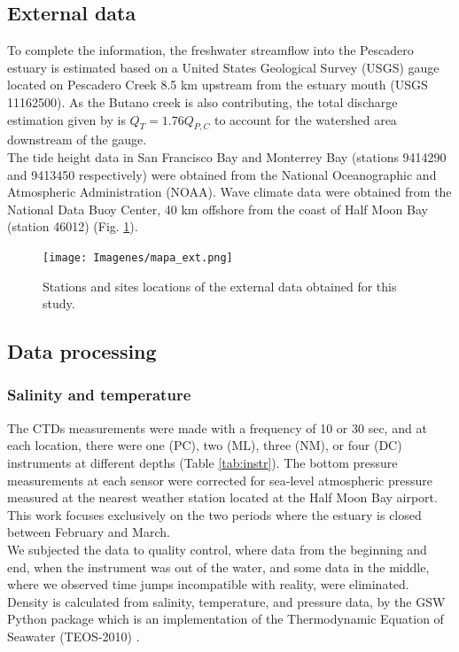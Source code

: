 \documentclass[tesis.tex]{subfiles}
\begin{document}
\subsection{External data}

To complete the information, the freshwater streamflow into the Pescadero estuary is estimated based on a United States Geological Survey (USGS) gauge located on Pescadero Creek 8.5 km upstream from the estuary mouth (USGS 11162500). As the Butano creek is also contributing, the total discharge estimation given by \cite{Williams2014} is $Q_{T} = 1.76 Q_{P,C}$ to account for the watershed area downstream of the gauge.\\

The tide height data in San Francisco Bay and Monterrey Bay (stations 9414290 and 9413450 respectively) were obtained from the National Oceanographic and Atmospheric Administration (NOAA). Wave climate data were obtained from the National Data Buoy Center, 40 km offshore from the coast of Half Moon Bay (station 46012) (Fig. \ref{fig:mapext}). 

\begin{figure}[h!]
    \centering
    \texttt{[image: Imagenes/mapa\_ext.png]}
    \caption{Stations and sites locations of the external data obtained for this study.}
    \label{fig:mapext}
\end{figure}

\subsection{Data processing}

\subsubsection{Salinity and temperature}

The CTDs measurements were made with a frequency of 10 or 30 sec, and at each location, there were one (PC), two (ML), three (NM), or four (DC) instruments at different depths (Table \ref{tab:instr}). The bottom pressure measurements at each sensor were corrected for sea-level atmospheric pressure measured at the nearest weather station located at the Half Moon Bay airport. This work focuses exclusively on the two periods where the estuary is closed between February and March.\\

We subjected the data to quality control, where data from the beginning and end, when the instrument was out of the water, and some data in the middle, where we observed time jumps incompatible with reality, were eliminated. Density is calculated from salinity, temperature, and pressure data, by the GSW Python package which is an implementation of the Thermodynamic Equation of Seawater (TEOS-2010) \citep{roquet2015accurate}.\\
\end{document}
